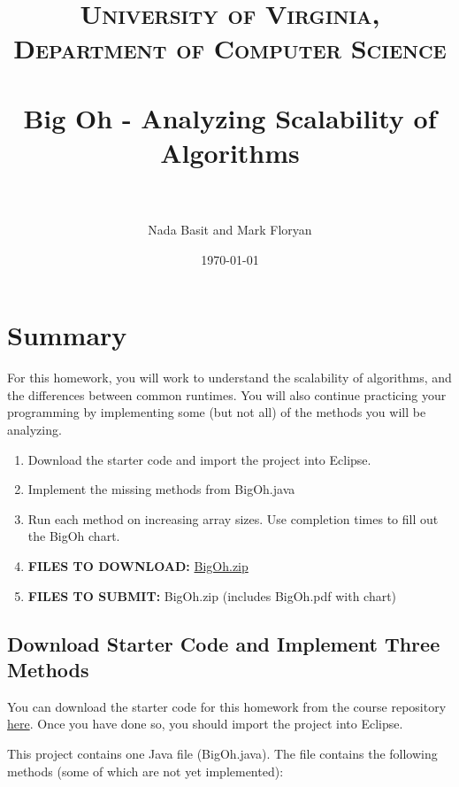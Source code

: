 \documentclass[paper=a4, fontsize=11pt, parskip=full]{scrartcl} %
\title{
\normalfont \normalsize
\textsc{University of Virginia, Department of Computer Science} \\ [25pt] %
\horrule{0.5pt} \\[0.4cm] %
\huge Big Oh - Analyzing Scalability of Algorithms \\ %
\horrule{2pt} \\[0.5cm] %
}
\author{Nada Basit and Mark Floryan}
\date{\normalsize\today} %
\numberwithin{equation}{section} %
\numberwithin{figure}{section} %
\numberwithin{table}{section} %
\begin{document}
\maketitle %


\section{Summary}

For this homework, you will work to understand the scalability of algorithms, and the differences between common runtimes. You will also continue practicing your programming by implementing some (but not all) of the methods you will be analyzing.

\begin{enumerate}
	\item Download the starter code and import the project into Eclipse.
	\item Implement the missing methods from BigOh.java
	\item Run each method on increasing array sizes. Use completion times to fill out the BigOh chart.
	\item \textbf{FILES TO DOWNLOAD:} \href{https://uva-cs.github.io/dsa1/homeworks/BigOh/code/BigOh.zip}{BigOh.zip}
	\item \textbf{FILES TO SUBMIT:} BigOh.zip (includes BigOh.pdf with chart)
\end{enumerate}


\subsection{Download Starter Code and Implement Three Methods}

You can download the starter code for this homework from the course repository \href{https://uva-cs.github.io/dsa1/homeworks/BigOh/code/BigOh.zip}{here}. Once you have done so, you should import the project into Eclipse.

This project contains one Java file (BigOh.java). The file contains the following methods (some of which are not yet implemented):
\end{document}
